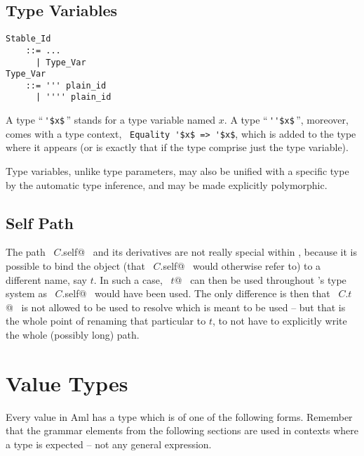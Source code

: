 \subsection{Type Variables}
\label{sec:type-variables}

\grammar\begin{lstlisting}
Stable_Id 
    ::= ...
      | Type_Var
Type_Var 
    ::= ''' plain_id
      | '''' plain_id
\end{lstlisting}

A type ``\,\lstinline!'$x$!\,'' stands for a type variable named $x$. A type ``\,\lstinline!''$x$!\,'', moreover, comes with a type context, ~\lstinline!Equality '$x$ => '$x$!, which is added to the type where it appears (or is exactly that if the type comprise just the type variable). 

Type variables, unlike type parameters, may also be unified with a specific type by the automatic type inference, and may be made explicitly polymorphic. 





\subsection{Self Path}
\label{sec:self-path}

The path ~\lstinline@$C$.self@~ and its derivatives are not really special within \Aml, because it is possible to bind the object (that ~\lstinline@$C$.self@~ would otherwise refer to) to a different name, say $t$. In such a case, ~\lstinline@$t$@~ can then be used throughout \Aml's type system as ~\lstinline@$C$.self@~ would have been used. The only difference is then that ~\lstinline@$C$.$t$@~ is not allowed to be used to resolve which  is meant to be used -- but that is the whole point of renaming that particular  to $t$, to not have to explicitly write the whole (possibly long) path. 






\section{Value Types}

Every value in Aml has a type which is of one of the following forms. Remember that the grammar elements from the following sections are used in contexts where a type is expected -- not any general expression. 





